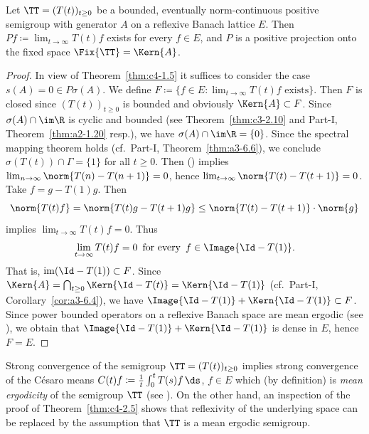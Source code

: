 \begin{theorem} \label{thm:c4-2.5}
%
Let $\TT = (T(t))_{t \geq 0}$ be a bounded, eventually norm-continuous positive semigroup with generator $A$ on a reflexive Banach lattice $E$.
Then $Pf \coloneqq  \lim_{t \to \infty} T(t)f$ exists for every $f \in E$, and
$P$ is a positive projection onto the fixed space $\Fix{\TT} = \Kern{A}$. 
\end{theorem}
\begin{proof}
In view of Theorem~\ref{thm:c4-1.5} it suffices to consider the case $s(A) = 0 \in P{\sigma}(A)$.
We define $F \coloneqq \{f \in E \colon \lim_{t \to \infty} T(t)f \text{ exists}\}$.
Then $F$ is closed since $(T(t))_{t \geq 0}$ is bounded and obviously $\Kern{A} \subset F$.
Since $\sigma(A) \cap \im\R$ is cyclic and bounded (see Theorem~\ref{thm:c3-2.10} and Part-I, Theorem~\ref{thm:a2-1.20} resp.), we have $\sigma(A) \cap \im\R = \{0\}$.
Since the spectral mapping theorem holds (cf.\ Part-I, Theorem~\ref{thm:a3-6.6}), we conclude $\sigma(T(t)) \cap \Gamma = \{1\}$ for all $t \geq 0$.
Then () implies $\lim_{n \to \infty} \norm{T(n) - T(n+1)} = 0$, hence $\lim_{t \to \infty}\norm{T(t) - T(t+1)} = 0$.
Take $f = g - T(1)g$.
Then 
%
\[
	\norm{T(t)f} = \norm{T(t)g - T(t+1)g} \leq \norm{T(t) - T(t+1)} \cdot \norm{g}
\]
%
implies $\lim_{t \to \infty} T(t)f = 0$.
Thus
\begin{equation}\label{eq:c4-2.5}
\lim_{t \to \infty} T(t)f = 0\, \text{ for every }\, f \in \Image{\Id - T(1)}.
\end{equation}
That is, $\mathrm{im}(\Id - T(1)) \subset F$.
Since $\Kern{A} = \bigcap_{t \geq 0} \Kern{\Id - T(t)} = \Kern{\Id - T(1)}$ (cf.\ Part-I, Corollary~\ref{cor:a3-6.4}), we have $\Image{\Id - T(1)} + \Kern{\Id - T(1)} \subset F$.
Since power bounded operators on a reflexive Banach space are mean ergodic (\eg  see \textcite[Chapter~2, Theorem~1.2]{krengel:1985}), we obtain that $\Image{\Id - T(1)} + \Kern{\Id - T(1)}$ is dense in $E$, hence $F = E$.
\end{proof}
Strong convergence of the semigroup $\TT = (T(t))_{t \geq 0}$ implies strong convergence of the Césaro means $C(t)f \coloneqq  \frac{1}{t}\int_{0}^{t} T(s)f \, \ds$, $f \in E$ which (by definition) is \emph{mean ergodicity} of the semigroup $\TT$ (see \textcite[Chap.5.1]{davies:1980}).
On the other hand, an inspection of the proof of Theorem~\ref{thm:c4-2.5} shows that reflexivity of the underlying space can be replaced by the assumption that $\TT$ is a mean ergodic semigroup.

